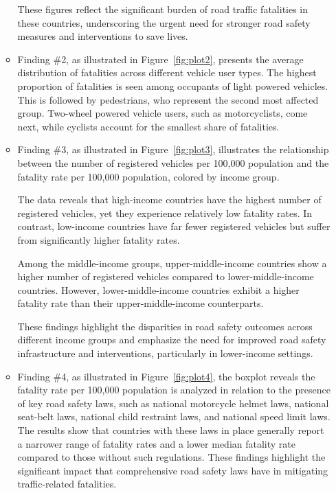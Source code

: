 \documentclass[a4paper,10pt]{article}\setlength{\textheight}{10in}\setlength{\textwidth}{6.5in}\setlength{\topmargin}{-0.125in}\setlength{\oddsidemargin}{-.2in}\setlength{\evensidemargin}{-.2in}\setlength{\headsep}{0.2in}\setlength{\footskip}{0pt}\usepackage{amsmath}\usepackage{fancyhdr}\usepackage{enumitem}\usepackage{hyperref}\usepackage{xcolor}\usepackage{graphicx}\usepackage[export]{adjustbox}\usepackage{caption}\usepackage{float}\usepackage{booktabs}\usepackage{makecell}\pagestyle{fancy}
\begin{document}
\begin{enumerate}[topsep=0mm, partopsep=0mm, leftmargin=*]
\begin{itemize}
        These figures reflect the significant burden of road traffic fatalities in these countries, underscoring the urgent need for stronger road safety measures and interventions to save lives.

        \item Finding \#2, as illustrated in Figure~\ref{fig:plot2}, presents the average distribution of fatalities across different vehicle user types. The highest proportion of fatalities is seen among occupants of light powered vehicles. This is followed by pedestrians, who represent the second most affected group. Two-wheel powered vehicle users, such as motorcyclists, come next, while cyclists account for the smallest share of fatalities.
        

        \item Finding \#3, as illustrated in Figure~\ref{fig:plot3}, illustrates the relationship between the number of registered vehicles per 100,000 population and the fatality rate per 100,000 population, colored by income group.

The data reveals that high-income countries have the highest number of registered vehicles, yet they experience relatively low fatality rates. In contrast, low-income countries have far fewer registered vehicles but suffer from significantly higher fatality rates.

Among the middle-income groups, upper-middle-income countries show a higher number of registered vehicles compared to lower-middle-income countries. However, lower-middle-income countries exhibit a higher fatality rate than their upper-middle-income counterparts.

These findings highlight the disparities in road safety outcomes across different income groups and emphasize the need for improved road safety infrastructure and interventions, particularly in lower-income settings.
        
        \item Finding \#4, as illustrated in Figure~\ref{fig:plot4}, the boxplot reveals the fatality rate per 100,000 population is analyzed in relation to the presence of key road safety laws, such as national motorcycle helmet laws, national seat-belt laws, national child restraint laws, and national speed limit laws. The results show that countries with these laws in place generally report a narrower range of fatality rates and a lower median fatality rate compared to those without such regulations. These findings highlight the significant impact that comprehensive road safety laws have in mitigating traffic-related fatalities.
    \end{itemize}







\end{enumerate}
\end{document}
